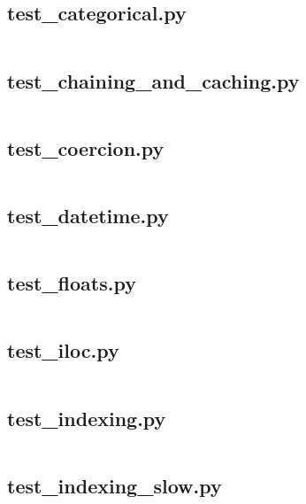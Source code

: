 \documentclass{article}
\begin{document}
\subsection{test\_categorical.py}
\inputminted{python}{/home/dufferzafar/dev/@clones/pandas/pandas/tests/indexing/test_categorical.py}
\newpage

\subsection{test\_chaining\_and\_caching.py}
\inputminted{python}{/home/dufferzafar/dev/@clones/pandas/pandas/tests/indexing/test_chaining_and_caching.py}
\newpage

\subsection{test\_coercion.py}
\inputminted{python}{/home/dufferzafar/dev/@clones/pandas/pandas/tests/indexing/test_coercion.py}
\newpage

\subsection{test\_datetime.py}
\inputminted{python}{/home/dufferzafar/dev/@clones/pandas/pandas/tests/indexing/test_datetime.py}
\newpage

\subsection{test\_floats.py}
\inputminted{python}{/home/dufferzafar/dev/@clones/pandas/pandas/tests/indexing/test_floats.py}
\newpage

\subsection{test\_iloc.py}
\inputminted{python}{/home/dufferzafar/dev/@clones/pandas/pandas/tests/indexing/test_iloc.py}
\newpage

\subsection{test\_indexing.py}
\inputminted{python}{/home/dufferzafar/dev/@clones/pandas/pandas/tests/indexing/test_indexing.py}
\newpage

\subsection{test\_indexing\_slow.py}
\inputminted{python}{/home/dufferzafar/dev/@clones/pandas/pandas/tests/indexing/test_indexing_slow.py}
\newpage
\end{document}
